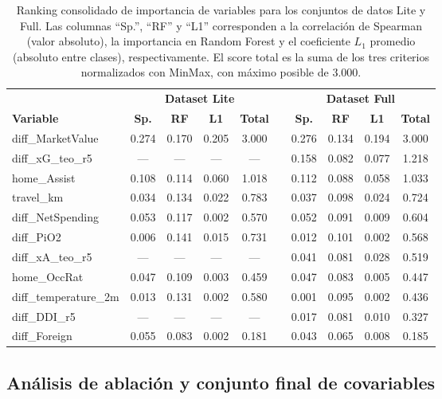 \begin{table}[htbp]
	\centering
	\caption{Ranking consolidado de importancia de variables para los conjuntos de datos Lite y Full. Las columnas ``Sp.'', ``RF'' y ``L1'' corresponden a la correlaci\'on de Spearman (valor absoluto), la importancia en Random Forest y el coeficiente $L_1$ promedio (absoluto entre clases), respectivamente. El score total es la suma de los tres criterios normalizados con MinMax, con m\'aximo posible de $3{.}000$.}
	\label{tab:ranking_variables}
	\small
	\begin{tabular}{lcccc|lcccc}
		\toprule
		& \multicolumn{4}{c}{\textbf{Dataset Lite}} & & 
		\multicolumn{4}{c}{\textbf{Dataset Full}} \\
		\cmidrule(lr){2-5} \cmidrule(lr){7-10}
		\textbf{Variable} & \textbf{Sp.} & \textbf{RF} & 
		\textbf{L1} & \textbf{Total} & & \textbf{Sp.} & 
		\textbf{RF} & \textbf{L1} & \textbf{Total} \\
		\midrule
		diff\_MarketValue & 0.274 & 0.170 & 0.205 & 3.000 & & 0.276 & 0.134 & 0.194 & 3.000 \\
		diff\_xG\_teo\_r5 & ---   & ---   & ---   & ---   & & 0.158 & 0.082 & 0.077 & 1.218 \\
		home\_Assist & 0.108 & 0.114 & 0.060 & 1.018 & & 0.112 & 0.088 & 0.058 & 1.033 \\
		travel\_km & 0.034 & 0.134 & 0.022 & 0.783 & & 0.037 & 0.098 & 0.024 & 0.724 \\
		diff\_NetSpending & 0.053 & 0.117 & 0.002 & 0.570 & & 0.052 & 0.091 & 0.009 & 0.604 \\
		diff\_PiO2 & 0.006 & 0.141 & 0.015 & 0.731 & & 0.012 & 0.101 & 0.002 & 0.568 \\
		diff\_xA\_teo\_r5 & --- & --- & ---   & --- & & 0.041 & 0.081 & 0.028 & 0.519 \\
		home\_OccRat & 0.047 & 0.109 & 0.003 & 0.459 & & 0.047 & 0.083 & 0.005 & 0.447 \\
		diff\_temperature\_2m & 0.013 & 0.131 & 0.002 & 0.580 & & 0.001 & 0.095 & 0.002 & 0.436 \\
		diff\_DDI\_r5 & --- & --- & --- & ---  & & 0.017 & 0.081 & 0.010 & 0.327 \\
		diff\_Foreign & 0.055 & 0.083 & 0.002 & 0.181 & & 0.043 & 0.065 & 0.008 & 0.185 \\
		\bottomrule
	\end{tabular}
\end{table}

\subsection{An\'alisis de ablaci\'on y conjunto final de covariables}
\label{subsec:conjunto_final}

